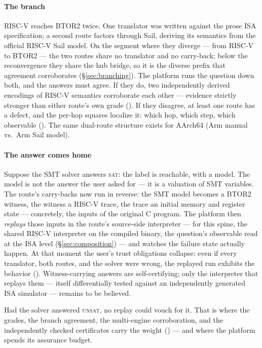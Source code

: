 \paragraph{The branch}
RISC-V reaches BTOR2 twice. One translator was written against the prose
ISA specification; a second route factors through Sail, deriving its
semantics from the official RISC-V Sail model. On the segment where they
diverge --- from RISC-V to BTOR2 --- the two routes share no translator
and no carry-back; below the reconvergence they share the hub bridge,
so it is the diverse prefix that agreement corroborates
(\S\ref{sec:branching}). The
platform runs the question down both, and the answers must agree. If they
do, two independently derived encodings of RISC-V semantics corroborate
each other --- evidence strictly stronger than either route's own grade
(). If they disagree, at least one route has a defect,
and the per-hop squares localize it: which hop, which step, which
observable (). The same dual-route
structure exists for AArch64 (Arm manual vs.\ Arm Sail model).

\paragraph{The answer comes home}
Suppose the SMT solver answers \textsc{sat}: the label is reachable, with
a model. The model is not the answer the user asked for --- it is a
valuation of SMT variables. The route's carry-backs now run in reverse:
the SMT model becomes a BTOR2 witness, the witness a RISC-V trace, the
trace an initial memory and register state --- concretely, the inputs of
the original C program. The platform then \emph{replays} those inputs in
the route's source-side interpreter --- for this spine, the shared
RISC-V interpreter on the compiled binary, the question's observable
read at the ISA level (\S\ref{sec:composition}) --- and watches the
failure state actually happen.
At that moment the user's trust obligations collapse: even if every
translator, both routes, and the solver were wrong, the replayed run
exhibits the behavior (). Witness-carrying answers
are self-certifying; only the interpreter that replays them --- itself
differentially tested against an independently generated ISA simulator ---
remains to be believed.

Had the solver answered \textsc{unsat}, no replay could vouch for it.
That is where the grades, the branch agreement, the multi-engine
corroboration, and the independently checked certificates carry the
weight () --- and where the platform spends its
assurance budget.

